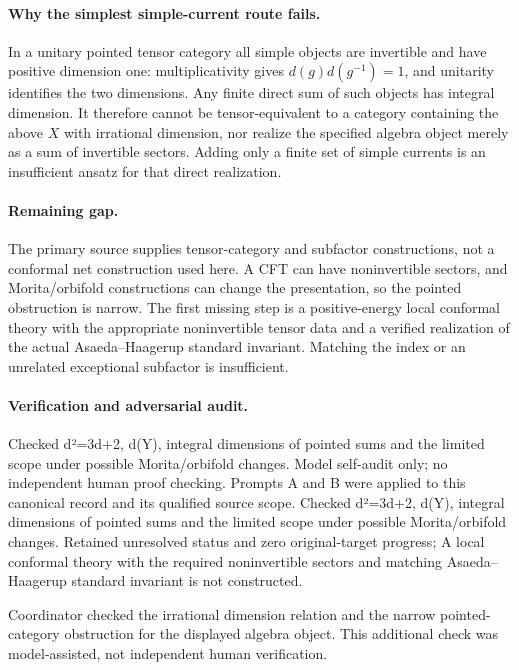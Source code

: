 \documentclass[11pt]{article}
\begin{document}
\paragraph{Why the simplest simple-current route fails.} In a unitary pointed tensor category all simple objects are invertible and have positive dimension one: multiplicativity gives $d(g)d(g^{-1})=1$, and unitarity identifies the two dimensions. Any finite direct sum of such objects has integral dimension. It therefore cannot be tensor-equivalent to a category containing the above $X$ with irrational dimension, nor realize the specified algebra object merely as a sum of invertible sectors. Adding only a finite set of simple currents is an insufficient ansatz for that direct realization.

\paragraph{Remaining gap.} The primary source supplies tensor-category and subfactor constructions, not a conformal net construction used here. A CFT can have noninvertible sectors, and Morita/orbifold constructions can change the presentation, so the pointed obstruction is narrow. The first missing step is a positive-energy local conformal theory with the appropriate noninvertible tensor data and a verified realization of the actual Asaeda--Haagerup standard invariant. Matching the index or an unrelated exceptional subfactor is insufficient.

\paragraph{Verification and adversarial audit.}
Checked d²=3d+2, d(Y), integral dimensions of pointed sums and the limited scope under possible Morita/orbifold changes. Model self-audit only; no independent human proof checking. Prompts A and B were applied to this canonical record and its qualified source scope. Checked d²=3d+2, d(Y), integral dimensions of pointed sums and the limited scope under possible Morita/orbifold changes. Retained unresolved status and zero original-target progress; A local conformal theory with the required noninvertible sectors and matching Asaeda–Haagerup standard invariant is not constructed.

Coordinator checked the irrational dimension relation and the narrow pointed-category obstruction for the displayed algebra object. This additional check was model-assisted, not independent human verification.
\end{document}
